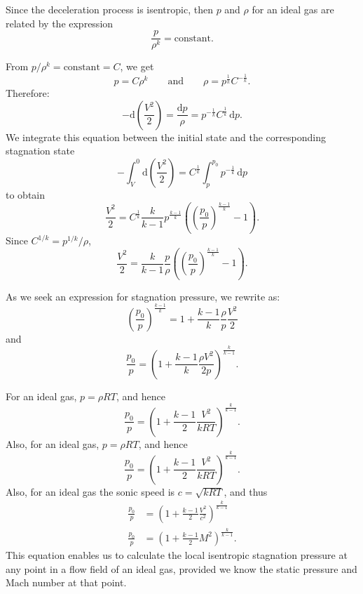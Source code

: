 Since the deceleration process is isentropic, then $p$ and $\rho$ for an ideal gas are related by the expression
\begin{equation*}
  \frac{p}{\rho^{k}} = \text{constant}
.\end{equation*}

From $p / \rho^{k} = \text{constant} = C$, we get
\begin{equation*}
  p = C \rho^{k} \qquad \text{and} \qquad \rho = p^{\frac{1}{k}} C^{-\frac{1}{k}}
.\end{equation*}
Therefore:
\begin{equation*}
  - \mathrm{d} \left( \frac{V^2}{2} \right) = \frac{\mathrm{d}p}{\rho} = p^{- \frac{1}{k}} C^{\frac{1}{k}} \, \mathrm{d}p
.\end{equation*}
We integrate this equation between the initial state and the corresponding stagnation state
\begin{equation*}
  - \int_{V}^{0} \mathrm{d} \left( \frac{V^2}{2} \right) = C^{\frac{1}{k}} \int_{p}^{p_0} p^{- \frac{1}{k}} \, \mathrm{d}p
\end{equation*}
to obtain
\begin{equation*}
  \frac{V^2}{2} = C^{\frac{1}{k}} \frac{k}{k-1} p ^{\frac{k-1}{k}} \left( \left( \frac{p_0}{p} \right)^{\frac{k-1}{k}}-1 \right)
.\end{equation*}
Since $C^{1 / k} = p^{1 / k} / \rho$,
\begin{equation*}
  \frac{V^2}{2} = \frac{k}{k-1} \frac{p}{\rho} \left( \left( \frac{p_0}{p} \right)^{\frac{k-1}{k}}-1 \right)
.\end{equation*}

As we seek an expression for stagnation pressure, we rewrite as:
\begin{equation*}
  \left( \frac{p_0}{p} \right)^{\frac{k-1}{k}} = 1 + \frac{k-1}{k} \frac{\rho}{p}\frac{V^2}{2}
\end{equation*}
and
\begin{equation*}
  \frac{p_0}{p} = \left( 1 + \frac{k - 1}{k} \frac{\rho V^2}{2p} \right)^{\frac{k}{k-1}}
.\end{equation*}

For an ideal gas, $p= \rho RT$, and hence
\begin{equation*}
  \frac{p_0}{p} = \left( 1 + \frac{k-1}{2} \frac{V^2}{kRT} \right)^{\frac{k}{k-1}}
.\end{equation*}
Also, for an ideal gas, $p = \rho RT$, and hence
\begin{equation*}
  \frac{p_0}{p} = \left( 1 + \frac{k-1}{2} \frac{V^2}{kRT} \right)^{\frac{k}{k-1}}
.\end{equation*}
Also, for an ideal gas the sonic speed is $c = \sqrt{kRT}$, and thus
\begin{align*}
  \frac{p_0}{p} &= \left( 1 + \frac{k-1}{2} \frac{V^2}{c^2} \right)^{\frac{k}{k-1}} \\
  \frac{p_0}{p} &= \left( 1 + \frac{k-1}{2} M^2 \right)^{\frac{k}{k-1}}
.\end{align*}
This equation enables us to calculate the local isentropic stagnation pressure at any point in a flow field of an ideal gas, provided we know the static pressure and Mach number at that point.

